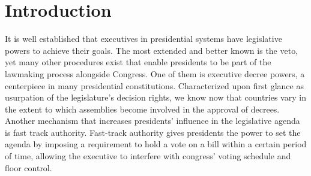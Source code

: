\documentclass[letter,12pt]{article}
\begin{document}








\doublespacing

\section{Introduction}

It is well established that executives in presidential systems have legislative powers to achieve their goals. The most extended and better known is the veto, yet many other procedures exist that enable presidents to be part of the lawmaking process alongside Congress. One of them is executive decree powers, a centerpiece in many presidential constitutions. Characterized upon first glance as usurpation of the legislature's decision rights, we know now that countries vary in the extent to which assemblies become involved in the approval of decrees. Another mechanism that increases presidents' influence in the legislative agenda is fast track authority. Fast-track authority gives presidents the power to set the agenda by imposing a requirement to hold a vote on a bill within a certain period of time, allowing the executive to interfere with congress' voting schedule and floor control. 
\end{document}

